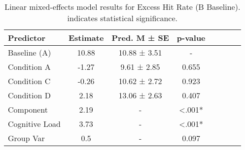 
    \begin{table}[H]
    \centering
    \begin{small}
    \begin{tabular}{lccccccc}
\toprule
Predictor & Estimate & Pred. M ± SE & p-value \\
\midrule
Baseline (A) & 10.88 & 10.88 ± 3.51 & - \\
Condition A & -1.27 & 9.61 ± 2.85 & 0.655 \\
Condition C & -0.26 & 10.62 ± 2.72 & 0.923 \\
Condition D & 2.18 & 13.06 ± 2.63 & 0.407 \\
Component & 2.19 & - & <.001* \\
Cognitive Load & 3.73 & - & <.001* \\
Group Var & 0.5 & - & 0.097 \\
\bottomrule
\end{tabular}

    \end{small}
    \caption[Linear mixed-effects model results for Excess Hit Rate (B Baseline)]{Linear mixed-effects model results for Excess Hit Rate (B Baseline). \newline * indicates statistical significance.}
    \label{tab:excesshitrate (b baseline)}

    \end{table}